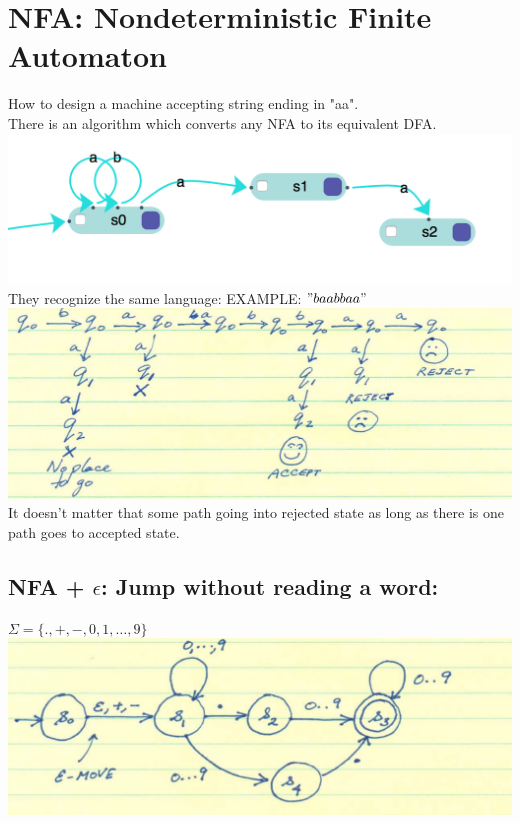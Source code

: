 \documentclass [9 pt]{article}
\theoremstyle{definition}
\begin{document}
\section*{NFA: Nondeterministic Finite Automaton}
How to design a machine accepting string ending in "aa".\\
There is an algorithm which converts any NFA to its equivalent DFA.\\
\includegraphics{2.png}
They recognize the same language: EXAMPLE: $"baabbaa"$\\
\includegraphics[scale = 0.8]{3.png}\\
It doesn't matter that some path going into rejected state as long as there is one path goes to accepted state.
\subsection*{NFA + $\epsilon$: Jump without reading a word: }
$\Sigma = \{. , + , -, 0, 1,\ldots ,9 \}$\\
\includegraphics{4}\\
\end{document}
